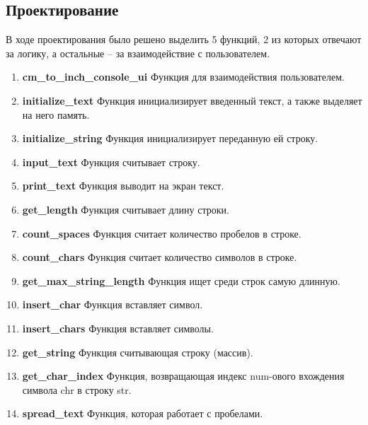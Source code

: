 \documentclass[12pt,a4paper]{report}
\begin{document}
\subsection{Проектирование}
\hspace{\parindent}
В ходе проектирования было решено выделить 5 функций, 2 из которых отвечают за логику, а остальные -- за взаимодействие с пользователем.
\begin{enumerate}

	\item \textbf{cm\_to\_inch\_console\_ui}
	Функция для взаимодействия пользователем.
	
	\item \textbf{initialize\_text}
	Функция инициализирует введенный текст, а также выделяет на него память.

	\item \textbf{initialize\_string}
	Функция инициализирует переданную ей строку.
	
	\item \textbf{input\_text}
	Функция считывает строку.
	
	\item \textbf{print\_text}
	Функция выводит на экран текст.
	
	\item \textbf{get\_length}
	Функция считывает длину строки.
	
	\item \textbf{count\_spaces}
	Функция считает количество пробелов в строке.
	
	\item \textbf{count\_chars}
	Функция считает количество символов в строке.
	
	\item \textbf{get\_max\_string\_length}
	Функция ищет среди строк самую длинную.
	
	\item \textbf{insert\_char}
	Функция вставляет символ.
	
	\item \textbf{insert\_chars}
	Функция вставляет символы.
	
	\item \textbf{get\_string}
	Функция считывающая строку (массив).
	
	\item \textbf{get\_char\_index}
	Функция, возвращающая индекс num-ового вхождения символа chr в строку str.
	
	\item \textbf{spread\_text}
	Функция, которая работает с пробелами.	

\end{enumerate}
\end{document}
